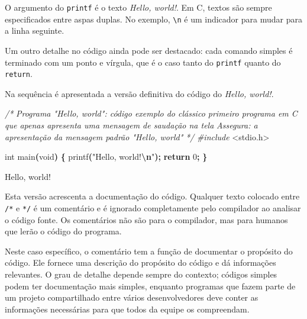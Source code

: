 \documentclass[
  11pt,
  a4paper,
]{scrbook}
\newenvironment{Shaded}{\begin{snugshade}}{\end{snugshade}}
\newcommand{\CommentTok}[1]{\textcolor[rgb]{0.56,0.35,0.01}{\textit{#1}}}
\newcommand{\ControlFlowTok}[1]{\textcolor[rgb]{0.13,0.29,0.53}{\textbf{#1}}}
\newcommand{\DataTypeTok}[1]{\textcolor[rgb]{0.13,0.29,0.53}{#1}}
\newcommand{\DecValTok}[1]{\textcolor[rgb]{0.00,0.00,0.81}{#1}}
\newcommand{\ImportTok}[1]{#1}
\newcommand{\NormalTok}[1]{#1}
\newcommand{\OperatorTok}[1]{\textcolor[rgb]{0.81,0.36,0.00}{\textbf{#1}}}
\newcommand{\PreprocessorTok}[1]{\textcolor[rgb]{0.56,0.35,0.01}{\textit{#1}}}
\newcommand{\SpecialCharTok}[1]{\textcolor[rgb]{0.81,0.36,0.00}{\textbf{#1}}}
\newcommand{\StringTok}[1]{\textcolor[rgb]{0.31,0.60,0.02}{#1}}
\begin{document}
O argumento do \texttt{printf} é o texto \emph{Hello, world!}. Em C,
textos são sempre especificados entre aspas duplas. No exemplo,
\texttt{\textbackslash{}n} é um indicador para mudar para a linha
seguinte.

Um outro detalhe no código ainda pode ser destacado: cada comando
simples é terminado com um ponto e vírgula, que é o caso tanto do
\texttt{printf} quanto do \texttt{return}.

Na sequência é apresentada a versão definitiva do código do \emph{Hello,
world!}.

\begin{Shaded}
\begin{Highlighting}[]
\CommentTok{/*}
\CommentTok{Programa "Hello, world": código exemplo do clássico primeiro programa em C}
\CommentTok{    que apenas apresenta uma mensagem de saudação na tela}
\CommentTok{Assegura: a apresentação da mensagem padrão "Hello, world"}
\CommentTok{*/}
\PreprocessorTok{\#include }\ImportTok{\textless{}stdio.h\textgreater{}}

\DataTypeTok{int}\NormalTok{ main}\OperatorTok{(}\DataTypeTok{void}\OperatorTok{)} \OperatorTok{\{}
\NormalTok{    printf}\OperatorTok{(}\StringTok{"Hello, world!}\SpecialCharTok{\textbackslash{}n}\StringTok{"}\OperatorTok{);}
    \ControlFlowTok{return} \DecValTok{0}\OperatorTok{;}
\OperatorTok{\}}
\end{Highlighting}
\end{Shaded}

\begin{Shaded}
\begin{Highlighting}[]
\NormalTok{Hello, world!}
\end{Highlighting}
\end{Shaded}

Esta versão acrescenta a documentação do código. Qualquer texto colocado
entre \texttt{/*} e \texttt{*/} é um comentário e é ignorado
completamente pelo compilador ao analisar o código fonte. Os comentários
não são para o compilador, mas para humanos que lerão o código do
programa.

Neste caso específico, o comentário tem a função de documentar o
propósito do código. Ele fornece uma descrição do propósito do código e
dá informações relevantes. O grau de detalhe depende sempre do contexto;
códigos simples podem ter documentação mais simples, enquanto programas
que fazem parte de um projeto compartilhado entre vários desenvolvedores
deve conter as informações necessárias para que todos da equipe os
compreendam.
\end{document}
